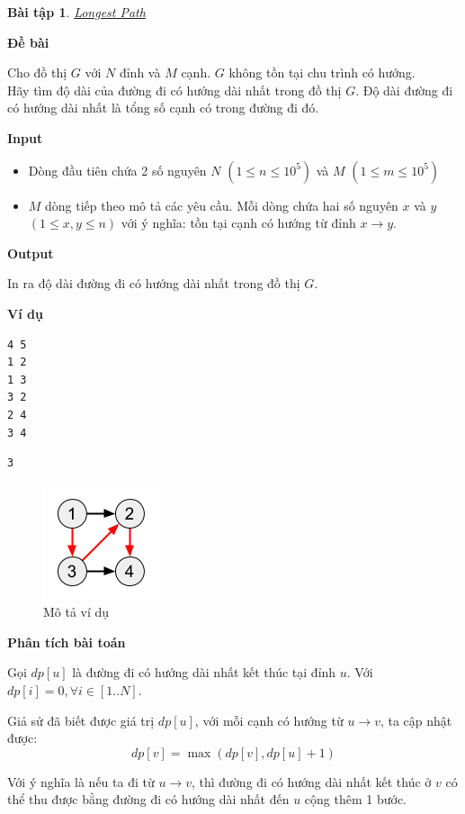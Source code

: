 \documentclass{article}
\newtheorem{baitap}{Bài tập}
\begin{document}
\begin{baitap}
    \href{https://atcoder.jp/contests/dp/tasks/dp_g}{Longest Path}
\end{baitap}

\textbf{Đề bài}

Cho đồ thị $G$ với $N$ đỉnh và $M$ cạnh. $G$ không tồn tại chu trình có hướng. \\

Hãy tìm độ dài của đường đi có hướng dài nhất trong đồ thị $G$. Độ dài đường đi có hướng dài nhất là tổng số cạnh có trong đường đi đó.

\textbf{Input}

\begin{itemize}
    \item Dòng đầu tiên chứa 2 số nguyên $N$ $(1 \leq n \leq 10^5)$ và $M$ $(1 \leq m \leq 10^5)$
    \item $M$ dòng tiếp theo mô tả các yêu cầu. Mỗi dòng chứa hai số nguyên $x$ và $y$ $(1 \leq x, y \leq n)$ với ý nghĩa: tồn tại cạnh có hướng từ đỉnh $x \rightarrow y$.
\end{itemize}

\textbf{Output}

In ra độ dài đường đi có hướng dài nhất trong đồ thị $G$.

\textbf{Ví dụ}
\begin{lstlisting}[caption={Input}]
4 5
1 2
1 3
3 2
2 4
3 4
\end{lstlisting}

\begin{lstlisting}[caption={Output}]
3
\end{lstlisting}

\begin{figure}[h]
    \centering
    \includegraphics[width=0.1 \textwidth]{img/b2/longest_0_muffet.png}
    \caption{Mô tả ví dụ}    
\end{figure}

\textbf{Phân tích bài toán}

Gọi $dp[u]$ là đường đi có hướng dài nhất kết thúc tại đỉnh $u$. Với $dp[i] = 0, \forall i \in [1..N]$. 

Giả sử đã biết được giá trị $dp[u]$, với mỗi cạnh có hướng từ $u \rightarrow v$, ta cập nhật được:
\[
    dp[v] = \max(dp[v], dp[u] + 1)
\]

Với ý nghĩa là nếu ta đi từ $u \rightarrow v$, thì đường đi có hướng dài nhất kết thúc ở $v$ có thể thu được bằng đường đi có hướng dài nhất đến $u$ cộng thêm 1 bước.
\end{document}
